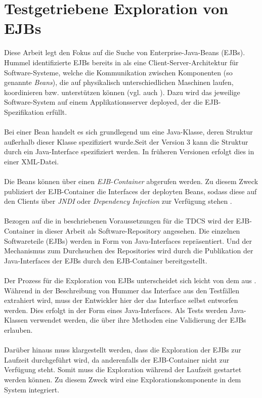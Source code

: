 \section{Testgetriebene Exploration von EJBs}
Diese Arbeit legt den Fokus auf die Suche von Enterprise-Java-Beans (EJBs). Hummel identifizierte EJBs bereits in \cite{hummel08} als eine Client-Server-Architektur für Software-Systeme, welche die Kommunikation zwischen Komponenten (so genannte \emph{Beans}), die auf physikalisch unterschiedlichen Maschinen laufen, koordinieren bzw. unterstützen können (vgl. auch \cite{ejbspec}). Dazu wird das jeweilige Software-System auf einem Applikationsserver deployed, der die EJB-Spezifikation \cite{ejbspec} erfüllt.
\\\\
Bei einer Bean handelt es sich grundlegend um eine Java-Klasse, deren Struktur außerhalb dieser Klasse spezifiziert wurde.Seit der Version 3 kann die Struktur durch ein Java-Interface spezifiziert werden. In früheren Versionen erfolgt dies in einer XML-Datei. \cite{ejbspec}
\\\\
Die Beans können über einen \emph{EJB-Container} abgerufen werden. Zu diesem Zweck publiziert der EJB-Container die Interfaces der deployten Beans, sodass diese auf den Clients über \emph{JNDI} oder \emph{Dependency Injection} zur Verfügung stehen \cite{ejbspec}.
\\\\
Bezogen auf die in \cite{hummel08} beschriebenen Voraussetzungen für die TDCS wird der EJB-Container in dieser Arbeit als Software-Repository angesehen. Die einzelnen Softwareteile (EJBs) werden in Form von Java-Interfaces repräsentiert. Und der Mechanismus zum Durchsuchen des Repositories wird durch die Publikation der Java-Interfaces der EJBs durch den EJB-Container bereitgestellt.
\\\\
Der Prozess für die Exploration von EJBs unterscheidet sich leicht von dem aus . Während in der Beschreibung von Hummer das Interface aus den Testfällen extrahiert wird, muss der Entwickler hier der das Interface selbst entworfen werden. Dies erfolgt in der Form eines Java-Interfaces. Als Tests werden Java-Klassen verwendet werden, die über ihre Methoden eine Validierung der EJBs erlauben.
\\\\
Darüber hinaus muss klargestellt werden, dass die Exploration der EJBs zur Laufzeit durchgeführt wird, da anderenfalls der EJB-Container nicht zur Verfügung steht. Somit muss die Exploration während der Laufzeit gestartet werden können. Zu diesem Zweck wird eine Explorationskomponente in dem System integriert. 
